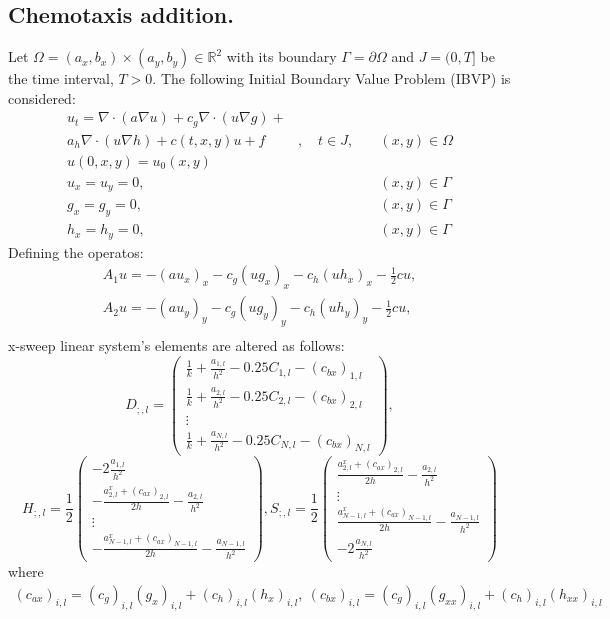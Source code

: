 \documentclass[12pt]{article}
\begin{document}
\subsection{Chemotaxis addition.}
Let $\Omega=(a_x, b_x)\times(a_y, b_y) \in \mathbb{R}^2$ with its boundary
$\Gamma=\partial \Omega$ and $J=(0,T]$ be the time interval, $T>0$. The
following Initial Boundary Value Problem (IBVP) is considered:
\begin{eqnarray}
u_t= \nabla\cdot(a\nabla u) + c_g\nabla\cdot(u \nabla g) +  \nonumber \\
a_h\nabla\cdot(u \nabla h) +c(t, x, y) u + f&, \quad t\in J, &\quad 
(x,y)\in \Omega \label{eq:heatChem}\\ 
u(0,x,y) = u_0(x,y) \nonumber \\ 
u_x=u_y= 0,&  &\quad (x,y) \in \Gamma \nonumber \\ 
g_x=g_y= 0, & &\quad (x,y) \in\Gamma \nonumber \\ 
h_x=h_y= 0, & &\quad (x,y) \in\Gamma \nonumber
\end{eqnarray}
Defining the operatos:
\begin{eqnarray}
A_1u = -(au_x)_x  - c_g(u g_x)_x - c_h(u h_x)_x  - \frac{1}{2}cu, \nonumber \\
A_2u = -(au_y)_y  - c_g(u g_y)_y - c_h(u h_y)_y  - \frac{1}{2}cu, \nonumber \\
\end{eqnarray}
x-sweep linear system's elements are altered as follows:
\[ D_{;,l} = \left( \begin{array}{c}
  \frac{1}{k} + \frac{a_{1,l}}{h^2} - 0.25 C_{1,l} - (c_{bx})_{1,l} \\
  \frac{1}{k} + \frac{a_{2,l}}{h^2} - 0.25 C_{2,l} - (c_{bx})_{2,l}\\
  \vdots \\
  \frac{1}{k} + \frac{a_{N,l}}{h^2} - 0.25 C_{N,l} - (c_{bx})_{N,l}
  \end{array} \right),
\]
%
\[
 H_{;,l} = \frac{1}{2}\left( \begin{array}{c}
  -2\frac{a_{1,l}}{h^2} \\
  -\frac{a^x_{2,l} + (c_{ax})_{2,l}}{2h} - \frac{a_{2,l}}{h^2} \\
  \vdots \\
  -\frac{a^x_{N-1,l} + (c_{ax})_{N-1,l}}{2h} - \frac{a_{N-1,l}}{h^2}
   \end{array}
\right),  
%
S_{;,l} = \frac{1}{2} \left( \begin{array}{c}
  \frac{a^x_{2,l} + (c_{ax})_{2,l}}{2h} - \frac{a_{2,l}}{h^2} \\
  \vdots \\
  \frac{a^x_{N-1,l} + (c_{ax})_{N-1,l}}{2h} - \frac{a_{N-1,l}}{h^2} \\
  -2\frac{a_{N, l}}{h^2}
  
   \end{array}
\right)\]
where
\begin{eqnarray}
 (c_{ax})_{i,l} = (c_g)_{i,l} (g_x)_{i,l} + (c_h)_{i,l} (h_x)_{i,l}, \: 
 (c_{bx})_{i,l} = (c_g)_{i,l} (g_{xx})_{i,l} + (c_h)_{i,l} (h_{xx})_{i,l} 
\end{eqnarray}
\end{document}

